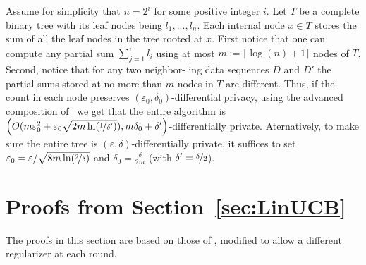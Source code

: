 \documentclass{article}
\begin{document}
Assume for simplicity that $n=2^i$ for some positive integer $i$. Let $T$ be a complete binary tree with its leaf nodes being $l_1,...,l_n$. Each internal
node $x\in T$ stores the sum of all the leaf nodes in the tree
rooted at $x$. First notice that one can compute any partial sum $\sum_{j=1}^i l_i$ using at most $m:=\lceil\log(n)+1\rceil$ nodes of $T$. Second, notice that for any two neighbor-
ing data sequences $D$ and $D'$ the partial sums stored at no more than $m$ nodes in $T$ are different. Thus, if the count in each node preserves $(\varepsilon_0,\delta_0)$-differential privacy, using the advanced composition of~\cite{DworkBoosting2010} we get that the entire algorithm is $\left(O(m\varepsilon_0^2+\varepsilon_0\sqrt{2m\ln(\nicefrac 1{\delta'})}), m\delta_0 + \delta'\right)$-differentially private. Aternatively, to make sure the entire tree is $(\varepsilon,\delta)$-differentially private, it suffices to set $\varepsilon_0 = \varepsilon / \sqrt{8m\ln(\nicefrac 2 \delta)}$ and $\delta_0= \tfrac \delta{2m}$ (with $\delta'=\nicefrac \delta 2$).

\section{Proofs from Section~\ref{sec:LinUCB}}

The proofs in this section are based on those of
\citet{AbbasiYadkoriImprovedAlgorithmsLinear2011}, modified to allow a
different regularizer at each round.

\CalcBeta*
\end{document}
